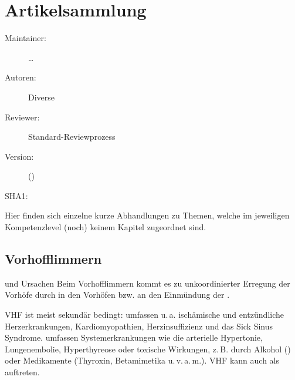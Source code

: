 \def\ChapterCode{ADVANCED}
\chapter
[\CO{[ADVANCED]} Artikelsammlung]
{Artikelsammlung}
\label{chp:ADVANCED-Artikel}

\ChapterIntro
{%

}
{%
\begin{description}
  \item[Maintainer:] \ldots
  \item[Autoren:] Diverse
  \item[Reviewer:] Standard-Reviewprozess
  \item[Version:] {\VarDocVersionTypeName} ({\VarDocVersionTypeDescription})
  \item[SHA1:] {\DocGitCommit}
\end{description}

{\TxTeilkapitelAASS}}

{\sffamily\noindent Hier finden sich einzelne kurze
Abhandlungen zu Themen, welche im jeweiligen Kompetenzlevel
(noch) keinem Kapitel zugeordnet sind.}

\clearpage %

\section{Vorhofflimmern}
\TextSlide
{{\TxBeschreibung} und Ursachen}%
{}%
{}%
Beim Vorhofflimmern kommt es zu
unkoordinierter Erregung der Vorhöfe durch 
 in den Vorhöfen bzw. an den 
Einmündung der .

VHF ist meist sekundär
bedingt:  umfassen u.\,a.
ischämische und entzündliche Herzerkrankungen,
Kardiomyopathien, Herzinsuffizienz und das Sick Sinus
Syndrome.
 umfassen Systemerkrankungen wie
die arterielle Hypertonie, Lungenembolie, Hyperthyreose
oder toxische Wirkungen, z.\,B. durch Alkohol () oder Medikamente (Thyroxin, Betamimetika
u.\,v.\,a.\,m.). VHF kann auch  als  auftreten. 


